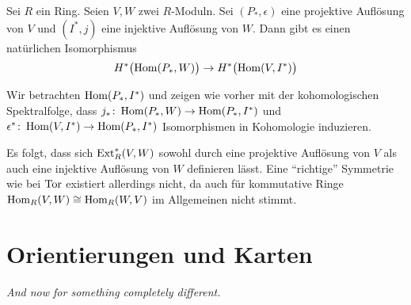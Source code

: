 \begin{satz}[{name=[{Kohomologie von Hom über projektive oder injektive Auflösung}]}]
	Sei $R$ ein Ring.
	Seien $V,W$ zwei $R$-Moduln.
	Sei $(P_*,\epsilon)$ eine projektive Auflösung von $V$ und $(I^*,j)$ eine injektive Auflösung von $W$.
	Dann gibt es einen natürlichen Isomorphismus 
	\[
		H^* \enbrace[\big]{\Hom(P_*,W)} \to H^* \enbrace[\big]{\Hom(V,I^*)}
	\]
\end{satz}
\begin{beweis}
	Wir betrachten $\Hom(P_*,I^*)$ und zeigen wie vorher mit der kohomologischen Spektralfolge, dass $j_* \colon \Hom \enbrace*{P_*,W} \to \Hom(P_*,I^*)$ und $\epsilon^* \colon \Hom(V,I^*) \to \Hom(P_*,I^*)$ Isomorphismen in Kohomologie induzieren.
\end{beweis}

\begin{bemerkung}[{name=[{\enquote{Symmetrie} von Ext}]}]
	Es folgt, dass sich $\Ext_R^*(V,W)$ sowohl durch eine projektive Auflösung von $V$ als auch eine injektive Auflösung von $W$ definieren lässt.
	Eine \enquote{richtige} Symmetrie wie bei $\Tor$ existiert allerdings nicht, da auch für kommutative Ringe $\Hom_R(V,W) \cong \Hom_R(W,V)$ im Allgemeinen nicht stimmt.
\end{bemerkung}
\newpage

\section{Orientierungen und Karten} %
\label{sec:19}

\emph{And now for something completely different.}

